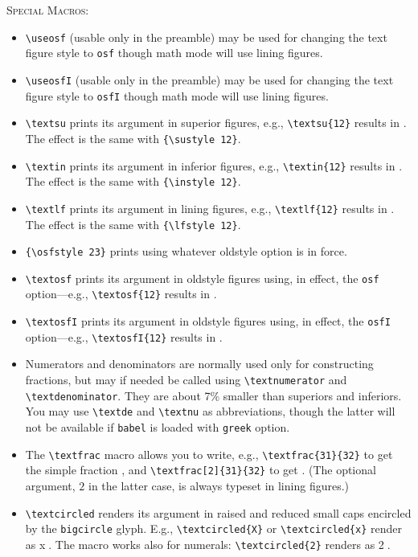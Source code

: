 \documentclass[11pt]{article}
\begin{document}
\textsc{Special Macros:}
\begin{itemize}
\item
\verb|\useosf| (usable only in the preamble) may be used for changing the text figure style to {\tt osf} though math mode will use lining figures.
\item \verb|\useosfI| (usable only in the preamble) may be used for changing the text figure style to {\tt osfI} though math mode will use lining figures.
\item \verb|\textsu| prints its argument in superior figures, e.g., \verb|\textsu{12}| results in . The effect is the same with \verb|{\sustyle 12}|.
\item \verb|\textin| prints its argument in inferior figures, e.g., \verb|\textin{12}| results in . The effect is the same with \verb|{\instyle 12}|.
\item \verb|\textlf| prints its argument in lining figures, e.g., \verb|\textlf{12}| results in . The effect is the same with \verb|{\lfstyle 12}|.
\item \verb|{\osfstyle 23}| prints  using whatever oldstyle option is in force. 
\item \verb|\textosf| prints its argument in oldstyle figures using, in effect, the {\tt osf} option---e.g., \verb|\textosf{12}| results in . 
\item \verb|\textosfI| prints its argument in oldstyle figures using, in effect, the {\tt osfI} option---e.g., \verb|\textosfI{12}| results in . 
\item Numerators and denominators are normally used only for constructing fractions, but may if needed be called using \verb|\textnumerator| and \verb|\textdenominator|. They are about 7\% smaller than superiors and inferiors. You may use \verb|\textde| and \verb|\textnu| as abbreviations, though the latter will not be available if {\tt babel} is loaded with {\tt greek} option.
\item The \verb|\textfrac| macro allows you to write, e.g.,  \verb|\textfrac{31}{32}| to get the simple fraction , and \verb|\textfrac[2]{31}{32}| to get . (The optional argument, $2$ in the latter case, is always typeset in lining figures.)
\item \verb|\textcircled| renders its argument in raised and reduced small caps encircled by the {\tt bigcircle} glyph. E.g., \verb|\textcircled{X}| or \verb|\textcircled{x}| render as \textcircled{x}. The macro works also for numerals: \verb|\textcircled{2}| renders as \textcircled{2}.
\end{itemize}
\end{document}
